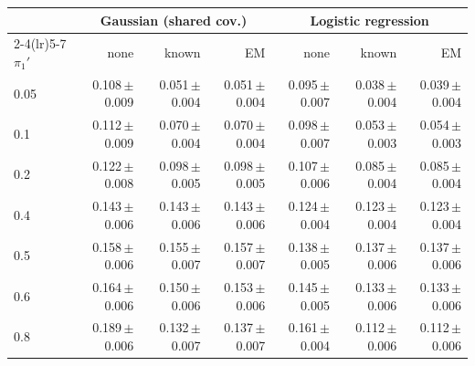 \begin{tabular}{lrrrrrr}
\toprule
 & \multicolumn{3}{c}{Gaussian (shared cov.)} & \multicolumn{3}{c}{Logistic regression} \\
\cmidrule(lr){2-4}\cmidrule(lr){5-7}
$\pi_1'$ & none & known & EM & none & known & EM \\
\midrule
0.05 & 0.108\,{\scriptsize$\pm$0.009} & 0.051\,{\scriptsize$\pm$0.004} & 0.051\,{\scriptsize$\pm$0.004} & 0.095\,{\scriptsize$\pm$0.007} & 0.038\,{\scriptsize$\pm$0.004} & 0.039\,{\scriptsize$\pm$0.004} \\
0.1 & 0.112\,{\scriptsize$\pm$0.009} & 0.070\,{\scriptsize$\pm$0.004} & 0.070\,{\scriptsize$\pm$0.004} & 0.098\,{\scriptsize$\pm$0.007} & 0.053\,{\scriptsize$\pm$0.003} & 0.054\,{\scriptsize$\pm$0.003} \\
0.2 & 0.122\,{\scriptsize$\pm$0.008} & 0.098\,{\scriptsize$\pm$0.005} & 0.098\,{\scriptsize$\pm$0.005} & 0.107\,{\scriptsize$\pm$0.006} & 0.085\,{\scriptsize$\pm$0.004} & 0.085\,{\scriptsize$\pm$0.004} \\
0.4 & 0.143\,{\scriptsize$\pm$0.006} & 0.143\,{\scriptsize$\pm$0.006} & 0.143\,{\scriptsize$\pm$0.006} & 0.124\,{\scriptsize$\pm$0.004} & 0.123\,{\scriptsize$\pm$0.004} & 0.123\,{\scriptsize$\pm$0.004} \\
0.5 & 0.158\,{\scriptsize$\pm$0.006} & 0.155\,{\scriptsize$\pm$0.007} & 0.157\,{\scriptsize$\pm$0.007} & 0.138\,{\scriptsize$\pm$0.005} & 0.137\,{\scriptsize$\pm$0.006} & 0.137\,{\scriptsize$\pm$0.006} \\
0.6 & 0.164\,{\scriptsize$\pm$0.006} & 0.150\,{\scriptsize$\pm$0.006} & 0.153\,{\scriptsize$\pm$0.006} & 0.145\,{\scriptsize$\pm$0.005} & 0.133\,{\scriptsize$\pm$0.006} & 0.133\,{\scriptsize$\pm$0.006} \\
0.8 & 0.189\,{\scriptsize$\pm$0.006} & 0.132\,{\scriptsize$\pm$0.007} & 0.137\,{\scriptsize$\pm$0.007} & 0.161\,{\scriptsize$\pm$0.004} & 0.112\,{\scriptsize$\pm$0.006} & 0.112\,{\scriptsize$\pm$0.006} \\
\bottomrule
\end{tabular}

